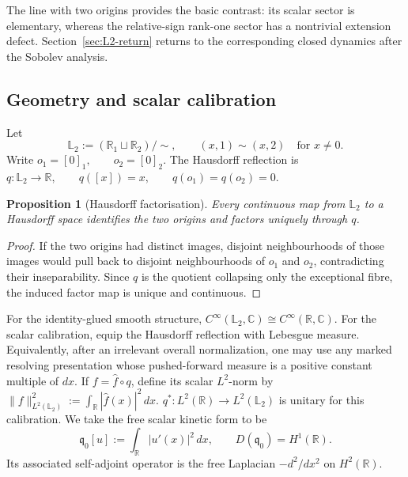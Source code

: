 \documentclass[11pt]{article}
\theoremstyle{plain}
\newtheorem{proposition}[theorem]{Proposition}
\theoremstyle{definition}
\newcommand{\Ltwo}{\mathbb{L}_{2}}
\begin{document}
The line with two origins provides the basic contrast: its scalar sector is elementary, whereas the relative-sign rank-one sector has a nontrivial extension defect. Section~\ref{sec:L2-return} returns to the corresponding closed dynamics after the Sobolev analysis.

\subsection{Geometry and scalar calibration}
\label{subsec:L2-geometry}

Let
\[
  \Ltwo
  :=
  (\mathbb{R}_1\sqcup\mathbb{R}_2)/\!\sim,
  \qquad
  (x,1)\sim(x,2)
  \quad
  \text{for }x\neq0.
\]
Write
\(o_1=[0]_1, \qquad o_2=[0]_2\).
The Hausdorff reflection is
\(q:\Ltwo\longrightarrow\mathbb{R}, \qquad q([x])=x, \qquad q(o_1)=q(o_2)=0\).

\begin{proposition}[Hausdorff factorisation]
\label{prop:L2-hausdorff-factorisation}
Every continuous map from \(\Ltwo\) to a Hausdorff space identifies the two
origins and factors uniquely through \(q\).
\end{proposition}

\begin{proof}
If the two origins had distinct images, disjoint neighbourhoods of those
images would pull back to disjoint neighbourhoods of \(o_1\) and \(o_2\),
contradicting their inseparability. Since \(q\) is the quotient collapsing
only the exceptional fibre, the induced factor map is unique and
continuous.
\end{proof}

For the identity-glued smooth structure,
\(C^\infty(\Ltwo,\mathbb C) \cong C^\infty(\mathbb R,\mathbb C)\).
For the scalar calibration, equip the Hausdorff reflection with Lebesgue
measure. Equivalently, after an irrelevant overall normalization, one may use
any marked resolving presentation whose pushed-forward measure is a positive
constant multiple of \(dx\). If \(f=\widehat f\circ q\), define its scalar
\(L^2\)-norm by
\(\|f\|_{L^2(\Ltwo)}^2 := \int_{\mathbb R}|\widehat f(x)|^2\,dx\).
\(q^*:L^2(\mathbb R)\to L^2(\Ltwo)\) is unitary for this calibration.
We take the free scalar kinetic form to be
\[
  \mathfrak q_0[u]
  :=
  \int_{\mathbb R}|u'(x)|^2\,dx,
  \qquad
  D(\mathfrak q_0)=H^1(\mathbb R).
\]
Its associated self-adjoint operator is the free Laplacian
\(-d^2/dx^2\) on \(H^2(\mathbb R)\).
\end{document}
